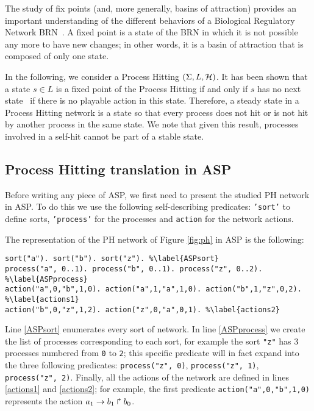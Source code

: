 The study of fix points (and, more generally, basins of attraction) provides an important understanding of the different behaviors of a Biological Regulatory Network BRN~\cite{wuensche1998genomic}.
%
A fixed point is a state of the BRN in which it is not possible any more to have new changes;
in other words, it is a basin of attraction that is composed of only one state.

In the following, we consider a Process Hitting $(\Sigma, L, \mathcal{H})$.
It has been shown that a state $s \in L$ is a fixed point of the Process Hitting if and only if $s$ has no next state~\cite{PMR10-TCSB} \ie if there is no playable action in this state.
Therefore, a steady state in a Process Hitting network is a state so that
every process does not hit or is not hit by another process in the same state.
We note that given this result, processes involved in a self-hit cannot be part of a stable state.

\subsection{Process Hitting translation in ASP}
Before writing any piece of ASP,
we first need to present the studied PH network in ASP.
To do this we use the following self-describing predicates:
\texttt{'sort'} to define sorts, \texttt{'process'} for the processes and \texttt{action} for the network actions. 

\begin{example}
\label{ex:asp-ph}
The representation of the PH network of Figure \ref{fig:ph} in ASP is the following:
\begin{lstlisting}
sort("a"). sort("b"). sort("z"). %\label{ASPsort}
process("a", 0..1). process("b", 0..1). process("z", 0..2). %\label{ASPprocess}
action("a",0,"b",1,0). action("a",1,"a",1,0). action("b",1,"z",0,2). %\label{actions1}
action("b",0,"z",1,2). action("z",0,"a",0,1). %\label{actions2}
\end{lstlisting}
Line \ref{ASPsort} enumerates every sort of network.
In line \ref{ASPprocess} we create the list of processes corresponding to each sort,
for example the sort \texttt{"z"} has 3 processes numbered from \texttt{0} to \texttt{2};
this specific predicate will in fact expand into the three following predicates:
\texttt{process("z", 0)}, \texttt{process("z", 1)}, \texttt{process("z", 2)}.
Finally, all the actions of the network are defined in lines \ref{actions1} and \ref{actions2};
for example, the first predicate \texttt{action("a",0,"b",1,0)} represents the action
$a_1\rightarrow b_1\Rsh b_0$.
\end{example}

